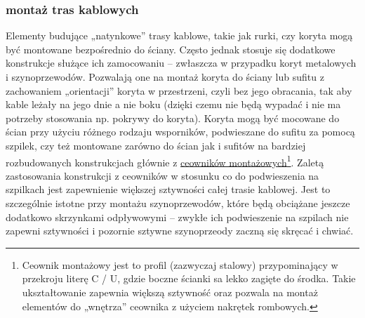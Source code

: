 \subsubsection{montaż tras kablowych}

Elementy budujące „natynkowe” trasy kablowe, takie jak rurki, czy koryta mogą być montowane bezpośrednio do ściany.
Często jednak stosuje się dodatkowe konstrukcje służące ich zamocowaniu – zwłaszcza w przypadku koryt metalowych i szynoprzewodów.
Pozwalają one na montaż koryta do ściany lub sufitu z zachowaniem „orientacji” koryta w przestrzeni,
	czyli bez jego obracania, tak aby kable leżały na jego dnie a nie boku (dzięki czemu nie będą wypadać i nie ma potrzeby stosowania np. pokrywy do koryta).
Koryta mogą być mocowane do ścian przy użyciu różnego rodzaju wsporników, podwieszane do sufitu za pomocą szpilek,
	czy też montowane zarówno do ścian jak i sufitów na bardziej rozbudowanych konstrukcjach głównie z \href{https://en.wikipedia.org/wiki/Strut_channel}{ceowników montażowych}\footnote{
		Ceownik montażowy jest to profil (zazwyczaj stalowy) przypominający w przekroju literę C / U, gdzie boczne ścianki sa lekko zagięte do środka.
		Takie ukształtowanie zapewnia większą sztywność oraz pozwala na montaż elementów do „wnętrza” ceownika z użyciem nakrętek rombowych.
	}.
Zaletą zastosowania konstrukcji z ceowników w stosunku co do podwieszenia na szpilkach jest zapewnienie większej sztywności całej trasie kablowej.
Jest to szczególnie istotne przy montażu szynoprzewodów, które będą obciążane jeszcze dodatkowo skrzynkami odpływowymi –
	zwykłe ich podwieszenie na szpilach nie zapewni sztywności i pozornie sztywne szynoprzeody zaczną się skręcać i chwiać.

